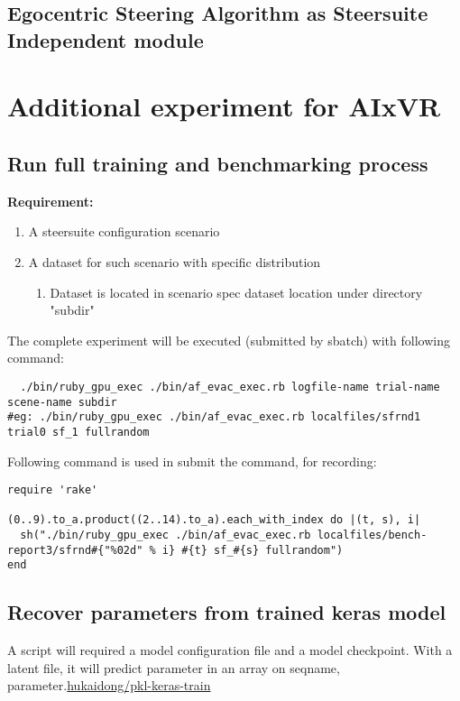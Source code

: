 \section{Egocentric Steering Algorithm as Steersuite Independent module} %
{}

\printbibliography


\chapter{Additional experiment for AIxVR}

\section{Run full training and benchmarking process} %

\textbf{Requirement:}
\begin{enumerate}
  \item A steersuite configuration scenario
  \item A dataset for such scenario with specific distribution
    \begin{enumerate}
      \item Dataset is located in scenario spec dataset location under directory "subdir"
    \end{enumerate}
\end{enumerate}

The complete experiment will be executed (submitted by sbatch) with following command:
\begin{verbatim}
  ./bin/ruby_gpu_exec ./bin/af_evac_exec.rb logfile-name trial-name scene-name subdir
#eg: ./bin/ruby_gpu_exec ./bin/af_evac_exec.rb localfiles/sfrnd1 trial0 sf_1 fullrandom
\end{verbatim}

Following command is used in submit the command, for recording:
\begin{verbatim}
require 'rake'

(0..9).to_a.product((2..14).to_a).each_with_index do |(t, s), i|
  sh("./bin/ruby_gpu_exec ./bin/af_evac_exec.rb localfiles/bench-report3/sfrnd#{"%02d" % i} #{t} sf_#{s} fullrandom")
end
\end{verbatim}


\section{Recover parameters from trained keras model} %
A script will required a model configuration file and a model checkpoint. With 
a latent file, it will predict parameter in an array on {seqname, 
parameter}.\href{https://github.com/hukaidong/pkl-keras-train/tree/f97d8b71bf7a55fad0450452a32b71ddcf606fe9}{hukaidong/pkl-keras-train}

